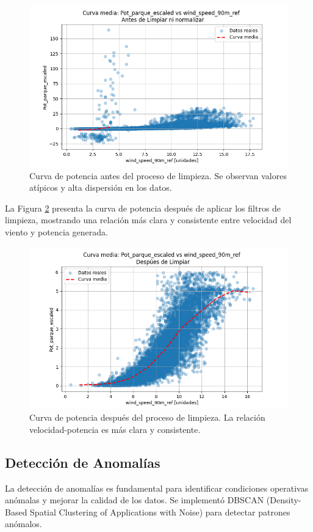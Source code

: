 \documentclass[conference]{IEEEtran}
\begin{document}
	\begin{figure}[htbp]
		\centering
		\includegraphics[width=0.8\linewidth]{images/Figure_1.png}
		\caption{Curva de potencia antes del proceso de limpieza. Se observan valores atípicos y alta dispersión en los datos.}
		\label{fig:curva_antes_limpieza}
	\end{figure}
	
	La Figura \ref{fig:curva_despues_limpieza} presenta la curva de potencia después de aplicar los filtros de limpieza, mostrando una relación más clara y consistente entre velocidad del viento y potencia generada.
	
	\begin{figure}[htbp]
		\centering
		\includegraphics[width=0.8\linewidth]{images/Figure_2.png}
		\caption{Curva de potencia después del proceso de limpieza. La relación velocidad-potencia es más clara y consistente.}
		\label{fig:curva_despues_limpieza}
	\end{figure}
	
	\subsection{Detección de Anomalías}
	La detección de anomalías es fundamental para identificar condiciones operativas anómalas y mejorar la calidad de los datos. Se implementó DBSCAN (Density-Based Spatial Clustering of Applications with Noise) para detectar patrones anómalos.
	
\end{document}
